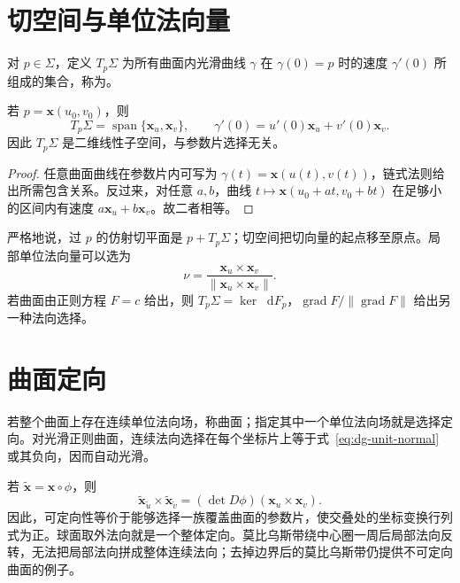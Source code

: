 \documentclass[UTF8,12pt,a4paper,fontset=fandol]{ctexbook}
\newcommand{\dd}{\mathop{}\!\mathrm d}
\newcommand{\norm}[1]{\lVert #1\rVert}
\DeclareMathOperator{\grad}{grad}
\begin{document}
\section{切空间与单位法向量}
\begin{definition}[切空间]
对 $p\in\Sigma$，定义 $T_p\Sigma$ 为所有曲面内光滑曲线 $\gamma$ 在 $\gamma(0)=p$ 时的速度 $\gamma'(0)$ 所组成的集合，称为。
\end{definition}
\begin{proposition}[切空间的坐标描述]
若 $p=\mathbf x(u_0,v_0)$，则
\begin{equation}
 T_p\Sigma=\operatorname{span}\{\mathbf x_u,\mathbf x_v\},
 \qquad
 \gamma'(0)=u'(0)\mathbf x_u+v'(0)\mathbf x_v.
 \label{eq:dg-tangent}
\end{equation}
因此 $T_p\Sigma$ 是二维线性子空间，与参数片选择无关。
\end{proposition}
\begin{proof}
任意曲面曲线在参数片内可写为 $\gamma(t)=\mathbf x(u(t),v(t))$，链式法则给出所需包含关系。反过来，对任意 $a,b$，曲线 $t\mapsto\mathbf x(u_0+at,v_0+bt)$ 在足够小的区间内有速度 $a\mathbf x_u+b\mathbf x_v$。故二者相等。
\end{proof}
严格地说，过 $p$ 的仿射切平面是 $p+T_p\Sigma$；切空间把切向量的起点移至原点。局部单位法向量可以选为
\begin{equation}
 \nu=\frac{\mathbf x_u\times\mathbf x_v}{\norm{\mathbf x_u\times\mathbf x_v}}.
 \label{eq:dg-unit-normal}
\end{equation}
若曲面由正则方程 $F=c$ 给出，则 $T_p\Sigma=\ker\dd F_p$，$\grad F/\norm{\grad F}$ 给出另一种法向选择。

\section{曲面定向}
\begin{definition}[可定向曲面]
若整个曲面上存在连续单位法向场，称曲面；指定其中一个单位法向场就是选择定向。对光滑正则曲面，连续法向选择在每个坐标片上等于式~\eqref{eq:dg-unit-normal} 或其负向，因而自动光滑。
\end{definition}
若 $\widetilde{\mathbf x}=\mathbf x\circ\phi$，则
\[
 \widetilde{\mathbf x}_{\widetilde u}\times
 \widetilde{\mathbf x}_{\widetilde v}
 =(\det D\phi)(\mathbf x_u\times\mathbf x_v).
\]
因此，可定向性等价于能够选择一族覆盖曲面的参数片，使交叠处的坐标变换行列式为正。球面取外法向就是一个整体定向。莫比乌斯带绕中心圈一周后局部法向反转，无法把局部法向拼成整体连续法向；去掉边界后的莫比乌斯带仍提供不可定向曲面的例子。
\end{document}
